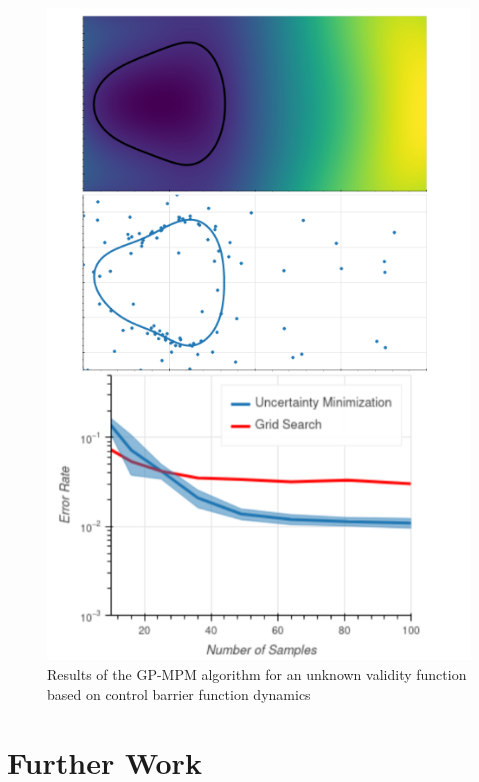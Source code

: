 \documentclass[12pt, conference]{IEEEtran}
\begin{document}
\begin{figure}[htbp]
    \centerline{\includegraphics[width=\columnwidth]{img/dyn_comp.png}}
    \caption{Results of the GP-MPM algorithm for an unknown validity function based on control barrier function dynamics}
    \label{fig:dyncomp}
\end{figure}

\section{Further Work}
\end{document}
